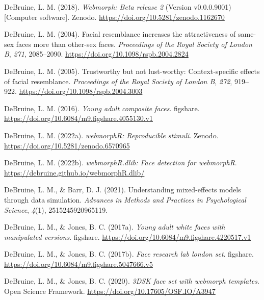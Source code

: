 \documentclass[
  man,floatsintext]{apa6}
\newlength{\cslhangindent}
\newlength{\cslentryspacingunit} %
\newenvironment{CSLReferences}[2] %
 {%
  \setlength{\parindent}{0pt}
  \ifodd #1
  \let\oldpar\par
  \def\par{\hangindent=\cslhangindent\oldpar}
  \fi
  \setlength{\parskip}{#2\cslentryspacingunit}
 }%
 {}
\begin{document}
\begin{CSLReferences}{1}{0}
\leavevmode{}%
DeBruine, L. M. (2018). \emph{Webmorph: Beta release 2} (Version v0.0.0.9001) {[}Computer software{]}. Zenodo. \url{https://doi.org/10.5281/zenodo.1162670}

\leavevmode{}%
DeBruine, L. M. (2004). Facial resemblance increases the attractiveness of same-sex faces more than other-sex faces. \emph{Proceedings of the Royal Society of London B}, \emph{271}, 2085--2090. \url{https://doi.org/10.1098/rspb.2004.2824}

\leavevmode{}%
DeBruine, L. M. (2005). Trustworthy but not lust-worthy: Context-specific effects of facial resemblance. \emph{Proceedings of the Royal Society of London B}, \emph{272}, 919--922. \url{https://doi.org/10.1098/rspb.2004.3003}

\leavevmode{}%
DeBruine, L. M. (2016). \emph{Young adult composite faces}. figshare. \url{https://doi.org/10.6084/m9.figshare.4055130.v1}

\leavevmode{}%
DeBruine, L. M. (2022a). \emph{{webmorphR}: Reproducible stimuli}. Zenodo. \url{https://doi.org/10.5281/zenodo.6570965}

\leavevmode{}%
DeBruine, L. M. (2022b). \emph{{webmorphR.dlib}: Face detection for webmorphR}. \url{https://debruine.github.io/webmorphR.dlib/}

\leavevmode{}%
DeBruine, L. M., \& Barr, D. J. (2021). Understanding mixed-effects models through data simulation. \emph{Advances in Methods and Practices in Psychological Science}, \emph{4}(1), 2515245920965119.

\leavevmode{}%
DeBruine, L. M., \& Jones, B. C. (2017a). \emph{Young adult white faces with manipulated versions}. figshare. \url{https://doi.org/10.6084/m9.figshare.4220517.v1}

\leavevmode{}%
DeBruine, L. M., \& Jones, B. C. (2017b). \emph{Face research lab london set}. figshare. \url{https://doi.org/10.6084/m9.figshare.5047666.v5}

\leavevmode{}%
DeBruine, L. M., \& Jones, B. C. (2020). \emph{3DSK face set with webmorph templates}. Open Science Framework. \url{https://doi.org/10.17605/OSF.IO/A3947}


\end{CSLReferences}
\end{document}
